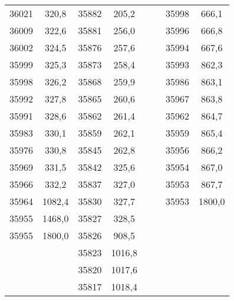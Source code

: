 \documentclass[11pt]{article}
\begin{document}
{{\begin{tabular}{|c|c|c|c|cccc}
            \cline{1-4} \cline{7-8} 
            36021 & 320,8 & 35882 & 205,2 &  & \multicolumn{1}{c|}{} & \multicolumn{1}{c|}{35998} & \multicolumn{1}{c|}{666,1}\tabularnewline
            \cline{1-4} \cline{7-8} 
            36009 & 322,6 & 35881 & 256,0 &  & \multicolumn{1}{c|}{} & \multicolumn{1}{c|}{35996} & \multicolumn{1}{c|}{666,8}\tabularnewline
            \cline{1-4} \cline{7-8} 
            36002 & 324,5 & 35876 & 257,6 &  & \multicolumn{1}{c|}{} & \multicolumn{1}{c|}{35994} & \multicolumn{1}{c|}{667,6}\tabularnewline
            \cline{1-4} \cline{7-8} 
            35999 & 325,3 & 35873 & 258,4 &  & \multicolumn{1}{c|}{} & \multicolumn{1}{c|}{35993} & \multicolumn{1}{c|}{862,3}\tabularnewline
            \cline{1-4} \cline{7-8} 
            35998 & 326,2 & 35868 & 259,9 &  & \multicolumn{1}{c|}{} & \multicolumn{1}{c|}{35986} & \multicolumn{1}{c|}{863,1}\tabularnewline
            \cline{1-4} \cline{7-8} 
            35992 & 327,8 & 35865 & 260,6 &  & \multicolumn{1}{c|}{} & \multicolumn{1}{c|}{35967} & \multicolumn{1}{c|}{863,8}\tabularnewline
            \cline{1-4} \cline{7-8} 
            35991 & 328,6 & 35862 & 261,4 &  & \multicolumn{1}{c|}{} & \multicolumn{1}{c|}{35962} & \multicolumn{1}{c|}{864,7}\tabularnewline
            \cline{1-4} \cline{7-8} 
            35983 & 330,1 & 35859 & 262,1 &  & \multicolumn{1}{c|}{} & \multicolumn{1}{c|}{35959} & \multicolumn{1}{c|}{865,4}\tabularnewline
            \cline{1-4} \cline{7-8} 
            35976 & 330,8 & 35845 & 262,8 &  & \multicolumn{1}{c|}{} & \multicolumn{1}{c|}{35956} & \multicolumn{1}{c|}{866,2}\tabularnewline
            \cline{1-4} \cline{7-8} 
            35969 & 331,5 & 35842 & 325,6 &  & \multicolumn{1}{c|}{} & \multicolumn{1}{c|}{35954} & \multicolumn{1}{c|}{867,0}\tabularnewline
            \cline{1-4} \cline{7-8} 
            35966 & 332,2 & 35837 & 327,0 &  & \multicolumn{1}{c|}{} & \multicolumn{1}{c|}{35953} & \multicolumn{1}{c|}{867,7}\tabularnewline
            \cline{1-4} \cline{7-8} 
            35964 & 1082,4 & 35830 & 327,7 &  & \multicolumn{1}{c|}{} & \multicolumn{1}{c|}{35953} & \multicolumn{1}{c|}{1800,0}\tabularnewline
            \cline{1-4} \cline{7-8} 
            35955 & 1468,0 & 35827 & 328,5 &  &  &  & \tabularnewline
            \cline{1-4} 
            35955 & 1800,0 & 35826 & 908,5 &  &  &  & \tabularnewline
            \cline{1-4} 
            \multicolumn{1}{c}{} &  & 35823 & 1016,8 &  &  &  & \tabularnewline
            \cline{3-4} 
            \multicolumn{1}{c}{} &  & 35820 & 1017,6 &  &  &  & \tabularnewline
            \cline{3-4} 
            \multicolumn{1}{c}{} &  & 35817 & 1018,4 &  &  &  & \tabularnewline

\end{tabular}}}
\end{document}
